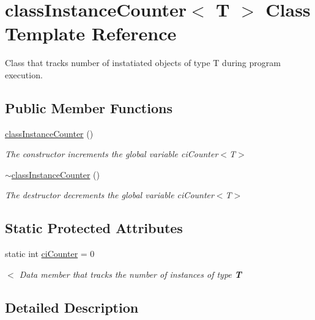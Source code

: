 \hypertarget{classclass_instance_counter}{}\section{class\+Instance\+Counter$<$ T $>$ Class Template Reference}
\label{classclass_instance_counter}


Class that tracks number of instatiated objects of type T during program execution.  


\subsection*{Public Member Functions}
\begin{DoxyCompactItemize}
\item 
\mbox{\hyperlink{classclass_instance_counter_a9d5f75752ecb644bd7e732a3b9d43702}{class\+Instance\+Counter}} ()
\begin{DoxyCompactList}\small\item\em The constructor increments the global variable ci\+Counter$<$\+T$>$ \end{DoxyCompactList}\item 
\mbox{\hyperlink{classclass_instance_counter_aa4bb00c47ae2c87fa51e447624361a0a}{$\sim$class\+Instance\+Counter}} ()
\begin{DoxyCompactList}\small\item\em The destructor decrements the global variable ci\+Counter$<$\+T$>$ \end{DoxyCompactList}\end{DoxyCompactItemize}
\subsection*{Static Protected Attributes}
\begin{DoxyCompactItemize}
\item 
static int \mbox{\hyperlink{classclass_instance_counter_a990f94f1650bb05ade3f4deba9110806}{ci\+Counter}} = 0
\begin{DoxyCompactList}\small\item\em $<$ Data member that tracks the number of instances of type {\bfseries T} \end{DoxyCompactList}\end{DoxyCompactItemize}


\subsection{Detailed Description}
